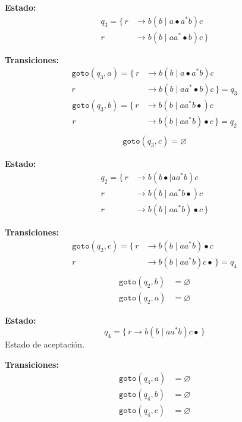 \documentclass[12pt,letterpaper]{article}
\begin{document}
\begin{enumerate}[label=\arabic*.]
\begin{enumerate}[label=\alph*.]
  \medskip
  
  \textbf{Estado:}
  \[
  \begin{aligned}
    q_3 =
    \{\,
    r &\to b (b \mid a \bullet a^*b)c \\
    r &\to b (b \mid aa^* \bullet b)c 
    \,\}
  \end{aligned}
  \]

  \textbf{Transiciones:}
  \[
  \begin{aligned}
    \texttt{goto}(q_3, a) =
    \{\,
    r &\to b (b \mid a \bullet a^*b)c \\
    r &\to b (b \mid aa^* \bullet b)c 
    \,\} = q_3
  \end{aligned}
  \]
  \[
  \begin{aligned}
    \texttt{goto}(q_3, b) =
    \{\,
    r &\to b (b \mid aa^*b \bullet )c \\
    r &\to b (b \mid aa^*b)\bullet c
    \,\} = q_2 \\
  \end{aligned}
  \]
  \[
  \begin{aligned}
    \texttt{goto}(q_3, c) = \varnothing
  \end{aligned}
  \]
  
  \medskip
  
  \textbf{Estado:}
  \[
    \begin{aligned}
      q_2 =
      \{\,
      r &\to b(b \bullet \mid aa^* b)c\\
      r &\to b(b \mid aa^*b\bullet)c\\
      r &\to b(b \mid aa^*b)\bullet c
      \,\}
    \end{aligned}
  \]

  \textbf{Transiciones:}
  \[
  \begin{aligned}
    \texttt{goto}(q_2, c) =
    \{\,
    r &\to b(b \mid aa^*b)\bullet c\\
    r &\to b(b \mid aa^*b)c \bullet
    \,\} = q_4\\
  \end{aligned}
  \]
  \[
  \begin{aligned}
    \texttt{goto}(q_2, b) &= \varnothing\\
    \texttt{goto}(q_2, a) &= \varnothing
  \end{aligned}
  \]

  \medskip
  
  \textbf{Estado:}
  \[
  q_4 = \{\, r \to b(b \mid aa^*b)c \bullet \,\}
  \]
  Estado de aceptación.

  \textbf{Transiciones:}
  \[
  \begin{aligned}
    \texttt{goto}(q_4, a) &= \varnothing\\
    \texttt{goto}(q_4, b) &= \varnothing\\
    \texttt{goto}(q_4, c) &= \varnothing
  \end{aligned}
  \]


\end{enumerate}
\end{enumerate}
\end{document}

